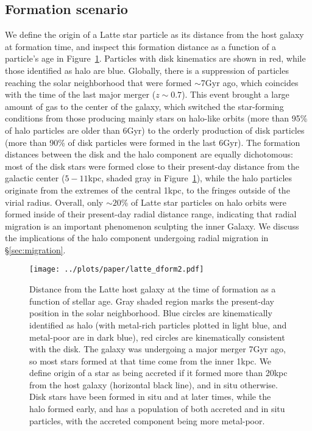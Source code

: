 \documentclass[apj, twocolappendix, numberedappendix, appendixfloats]{emulateapj}
\begin{document}
\subsection{Formation scenario}
We define the origin of a Latte star particle as its distance from the host galaxy at formation time, and inspect this formation distance as a function of a particle's age in Figure~\ref{fig:dform}.
Particles with disk kinematics are shown in red, while those identified as halo are blue.
Globally, there is a suppression of particles reaching the solar neighborhood that were formed $\sim$7\;Gyr ago, which coincides with the time of the last major merger ($z\sim0.7$).
This event brought a large amount of gas to the center of the galaxy, which switched the star-forming conditions from those producing mainly stars on halo-like orbits (more than 95\% of halo particles are older than 6\;Gyr) to the orderly production of disk particles (more than 90\% of disk particles were formed in the last 6\;Gyr).
The formation distances between the disk and the halo component are equally dichotomous: most of the disk stars were formed close to their present-day distance from the galactic center ($5-11$\;kpc, shaded gray in Figure~\ref{fig:dform}), while the halo particles originate from the extremes of the central 1\;kpc, to the fringes outside of the virial radius.
Overall, only $\sim20$\% of Latte star particles on halo orbits were formed inside of their present-day radial distance range, indicating that radial migration is an important phenomenon sculpting the inner Galaxy.
We discuss the implications of the halo component undergoing radial migration in \S\ref{sec:migration}.

\begin{figure}
\begin{center}
\texttt{[image: ../plots/paper/latte\_dform2.pdf]}
\caption{Distance from the Latte host galaxy at the time of formation as a function of stellar age.
Gray shaded region marks the  present-day position in the solar neighborhood.
Blue circles are kinematically identified as halo (with metal-rich particles plotted in light blue, and metal-poor are in dark blue), red circles are kinematically consistent with the disk.
The galaxy was undergoing a major merger 7\;Gyr ago, so most stars formed at that time come from the inner 1\;kpc. 
We define origin of a star as being accreted if it formed more than 20\;kpc from the host galaxy (horizontal black line), and in situ otherwise.
Disk stars have been formed in situ and at later times, while the halo formed early, and has a population of both accreted and in situ particles, with the accreted component being more metal-poor.}
\label{fig:dform}
\end{center}
\end{figure}
\end{document}
